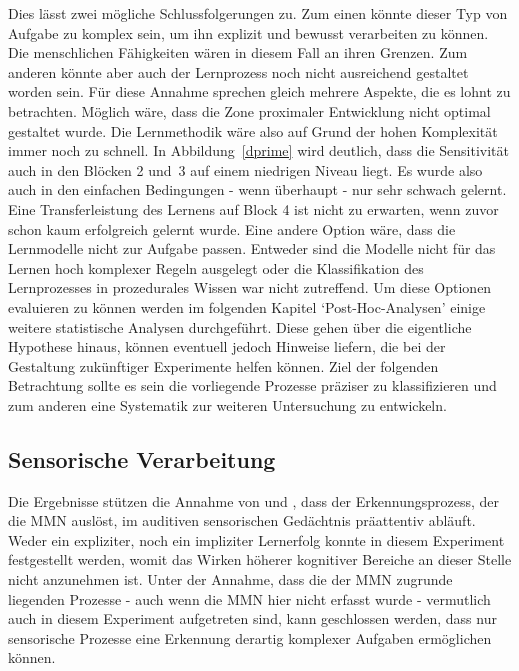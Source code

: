 \documentclass[doc,a4paper,12pt]{apa6}
\begin{document}
Dies lässt zwei mögliche Schlussfolgerungen zu. Zum einen könnte dieser Typ von Aufgabe zu komplex sein, um ihn explizit und bewusst verarbeiten zu können. Die menschlichen Fähigkeiten wären in diesem Fall an ihren Grenzen. Zum anderen könnte aber auch der Lernprozess noch nicht ausreichend gestaltet worden sein. Für diese Annahme sprechen gleich mehrere Aspekte, die es lohnt zu betrachten. Möglich wäre, dass die Zone proximaler Entwicklung \parencite{kozulin2003vygotsky} nicht optimal gestaltet wurde. Die Lernmethodik wäre also auf Grund der hohen Komplexität immer noch zu schnell. In Abbildung~\ref{dprime} wird deutlich, dass die Sensitivität auch in den Blöcken 2 und~3 auf einem niedrigen Niveau liegt. Es wurde also auch in den einfachen Bedingungen - wenn überhaupt - nur sehr schwach gelernt. Eine Transferleistung des Lernens auf Block 4 ist nicht zu erwarten, wenn zuvor schon kaum erfolgreich gelernt wurde. Eine andere Option wäre, dass die Lernmodelle nicht zur Aufgabe passen. Entweder sind die Modelle nicht für das Lernen hoch komplexer Regeln ausgelegt oder die Klassifikation des Lernprozesses in prozedurales Wissen war nicht zutreffend. Um diese Optionen evaluieren zu können werden im folgenden Kapitel `Post-Hoc-Analysen' einige weitere statistische Analysen durchgeführt. Diese gehen über die eigentliche Hypothese hinaus, können eventuell jedoch Hinweise liefern, die bei der Gestaltung zukünftiger Experimente helfen können. Ziel der folgenden Betrachtung sollte es sein die vorliegende Prozesse präziser zu klassifizieren und zum anderen eine Systematik zur weiteren Untersuchung zu entwickeln.

\subsection{Sensorische Verarbeitung}

Die Ergebnisse stützen die Annahme von \textcite{paavilainen2007preattentive} und \textcite{bendixen2008rapid}, dass der Erkennungsprozess, der die MMN auslöst, im auditiven sensorischen Gedächtnis präattentiv abläuft. Weder ein expliziter, noch ein impliziter Lernerfolg konnte in diesem Experiment festgestellt werden, womit das Wirken höherer kognitiver Bereiche an dieser Stelle nicht anzunehmen ist. Unter der Annahme, dass die der MMN zugrunde liegenden Prozesse - auch wenn die MMN hier nicht erfasst wurde - vermutlich auch in diesem Experiment aufgetreten sind, kann geschlossen werden, dass nur sensorische Prozesse eine Erkennung derartig komplexer Aufgaben ermöglichen können.
\end{document}
